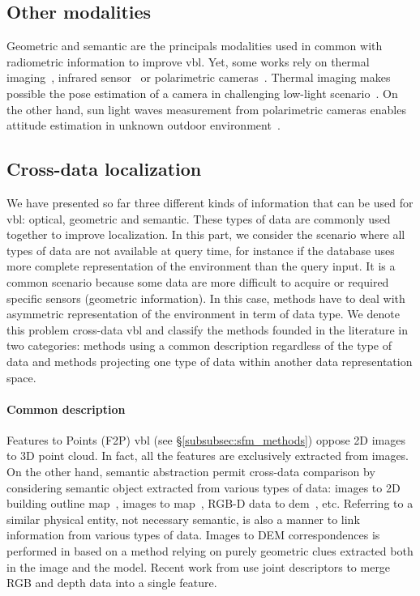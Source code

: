 	\subsection{Other modalities}
	\label{subsec:other_modalities}
	
	Geometric and semantic are the principals modalities used in common with radiometric information to improve \ac{vbl}. Yet, some works rely on thermal imaging~\citep{Lu2016}, infrared sensor~\citep{Bonardi2017} or polarimetric cameras~\citep{Rastgoo2018}. Thermal imaging makes possible the pose estimation of a camera in challenging low-light scenario~\citep{Lu2016}. On the other hand, sun light waves measurement from polarimetric cameras enables attitude estimation in unknown outdoor environment~\citep{Rastgoo2018}.
				
	\subsection{Cross-data localization}
	
	
	\label{subsec:cross_data}        
		We have presented so far three different kinds of information that can be used for \ac{vbl}: optical, geometric and semantic. These types of data are commonly used together to improve localization. In this part, we consider the scenario where all types of data are not available at query time, for instance if the database uses more complete representation of the environment than the query input. It is a common scenario because some data are more difficult to acquire or required specific sensors (\eg geometric information). In this case, methods have to deal with asymmetric representation of the environment in term of data type. We denote this problem cross-data \ac{vbl} and classify the methods founded in the literature in two categories: methods using a common description regardless of the type of data and methods projecting one type of data within another data representation space.
		
    	\paragraph{Common description}
    		Features to Points (F2P) \ac{vbl} (see \S\ref{subsubsec:sfm_methods}) oppose 2D images to 3D point cloud. In fact, all the features are exclusively extracted from images. On the other hand, semantic abstraction permit cross-data comparison by considering semantic object extracted from various types of data: images to 2D building outline map~\citep{Cham2010}, images to map~\citep{Ardeshir2014,Qu2015,Castaldo2015,Brubaker2016}, RGB-D data to \ac{dem}~\citep{Christie2016}, etc. Referring to a similar physical entity, not necessary semantic, is also a manner to link information from various types of data. Images to DEM correspondences is performed in \citep{Bansal2014} based on a method relying on purely geometric clues extracted both in the image and the model. Recent work from \citep{Sizikova2016,Li2017} use joint descriptors to merge RGB and depth data into a single feature.
					
